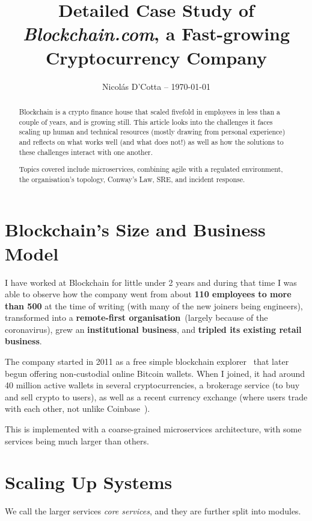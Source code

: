 \documentclass[conference]{IEEEtran}
\title{Detailed Case Study of \emph{Blockchain.com}, a Fast-growing Cryptocurrency Company}
\begin{document}
    \author{Nicolás D'Cotta -- \today}

    \maketitle

    \begin{abstract}
        Blockchain is a crypto finance house that scaled fivefold in
        employees in less than a couple of years, and is growing still.
        This article looks into the challenges it faces scaling up human and technical resources (mostly drawing from personal experience) and reflects on what works well (and what does not!) as well as how the solutions to these challenges interact with one another.

        Topics covered include microservices, combining agile with a regulated environment, the organisation's topology, Conway's Law, SRE, and incident response.
    \end{abstract}


    \section{Blockchain's Size and Business Model}\label{sec:business}

    I have worked at Blockchain for little under 2 years and during that time I was able to observe
    how the company went from about \textbf{110 employees to more than 500} at the time of writing (with many
    of the new joiners being engineers), transformed into a \textbf{remote-first organisation}~(largely because
    of the coronavirus), grew an \textbf{institutional business}, and \textbf{tripled its existing retail business}.

    The company started in 2011 as a free simple blockchain explorer~\cite{bcAbout} that later
    begun offering non-custodial online Bitcoin wallets.
    When I joined, it had around 40 million active wallets in several cryptocurrencies,
    a brokerage service (to buy and sell crypto to users), as well as a recent currency
    exchange (where users trade with each other, not unlike Coinbase~\cite{coinbasePro}).

    This is implemented with a coarse-grained microservices architecture, with some services
    being much larger than others.


    \section{Scaling Up Systems}
    We call the larger services \emph{core services}, and they are further split into modules.
\end{document}
